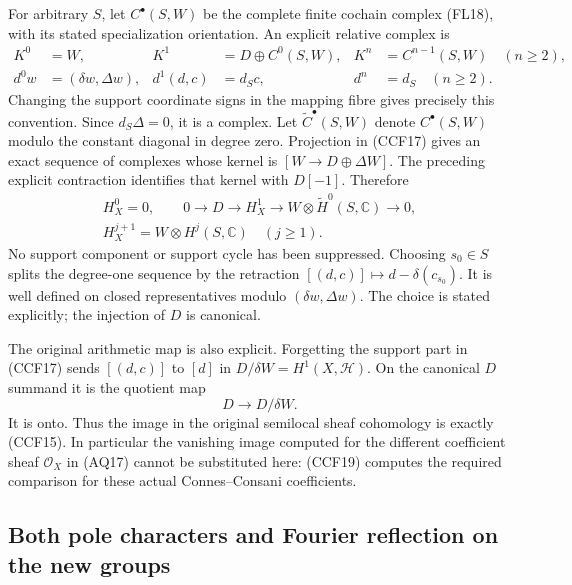 For arbitrary $S$, let $C^\bullet(S,W)$ be the complete finite
cochain complex (FL18), with its stated specialization orientation.
An explicit relative complex is
\[
 \begin{aligned}
 K^0&=W,& K^1&=D\oplus C^0(S,W),&
 K^{n}&=C^{n-1}(S,W)\quad(n\ge2),\\
 d^0w&=(\delta w,\Delta w),& d^1(d,c)&=d_Sc,&
 d^{n}&=d_S\quad(n\ge2).
 \end{aligned}
 \tag{CCF17}
\]
Changing the support coordinate signs in the mapping fibre
gives precisely this convention. Since $d_S\Delta=0$, it is
a complex. Let $\widetilde C^\bullet(S,W)$ denote
$C^\bullet(S,W)$ modulo the constant diagonal in degree zero.
Projection in (CCF17) gives an exact sequence of complexes
whose kernel is $[W\to D\oplus\Delta W]$. The preceding explicit
contraction identifies that kernel with $D[-1]$. Therefore
\[
 \begin{gathered}
 H_X^0=0,\qquad
 0\longrightarrow D\longrightarrow H_X^1
   \longrightarrow W\otimes\widetilde H^0(S,\mathbb C)
   \longrightarrow0,\\
 H_X^{j+1}=W\otimes H^j(S,\mathbb C)\quad(j\ge1).
 \end{gathered}
 \tag{CCF18}
\]
No support component or support cycle has been suppressed.
Choosing $s_0\in S$ splits the degree-one sequence by the
retraction $[(d,c)]\mapsto d-\delta(c_{s_0})$. It is well defined
on closed representatives modulo $(\delta w,\Delta w)$.
The choice is stated explicitly; the injection of $D$ is canonical.

The original arithmetic map is also explicit. Forgetting the
support part in (CCF17) sends $[(d,c)]$ to $[d]$ in
$D/\delta W=H^1(X,\mathcal H)$. On the canonical $D$ summand it
is the quotient map
\[
 D\longrightarrow D/\delta W.
 \tag{CCF19}
\]
It is onto. Thus the image in the original semilocal sheaf
cohomology is exactly (CCF15). In particular the vanishing image
computed for the different coefficient sheaf $\mathcal O_X$ in
(AQ17) cannot be substituted here: (CCF19) computes the required
comparison for these actual Connes--Consani coefficients.

\subsection{Both pole characters and Fourier reflection on the new groups}

